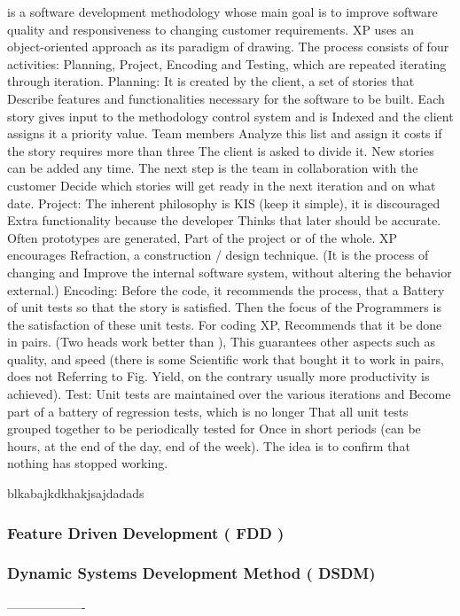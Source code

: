 is a software development methodology whose main goal is to improve software quality and responsiveness to changing customer requirements. 
XP uses an object-oriented approach as its paradigm of
drawing. The process consists of four activities: Planning, Project,
Encoding and Testing, which are repeated iterating through iteration.
Planning: It is created by the client, a set of stories that
Describe features and functionalities necessary for the software to be
built. Each story gives input to the methodology control system and is
Indexed and the client assigns it a priority value. Team members
Analyze this list and assign it costs if the story requires more than three
The client is asked to divide it. New stories can be added
any time. The next step is the team in collaboration with the customer
Decide which stories will get ready in the next iteration and on what date.
Project: The inherent philosophy is KIS (keep it simple), it is discouraged
Extra functionality because the developer
Thinks that later should be accurate. Often prototypes are generated,
Part of the project or of the whole. XP encourages
Refraction, a construction / design technique. (It is the process of changing and
Improve the internal software system, without altering the behavior
external.)
Encoding: Before the code, it recommends the process, that a
Battery of unit tests so that the story is satisfied. Then the focus of the
Programmers is the satisfaction of these unit tests. For coding XP,
Recommends that it be done in pairs. (Two heads work better than
), This guarantees other aspects such as quality, and speed (there is some
Scientific work that bought it to work in pairs, does not
Referring to Fig.
Yield, on the contrary usually more productivity is achieved).
Test: Unit tests are maintained over the various iterations and
Become part of a battery of regression tests, which is no longer
That all unit tests grouped together to be periodically tested for
Once in short periods (can be hours, at the end of the day, end of the week).
The idea is to confirm that nothing has stopped working.


blkabajkdkhakjsajdadads

\subsubsection{Feature Driven Development ( FDD )}
\subsubsection{Dynamic Systems Development Method ( DSDM) }
-------------------\\



